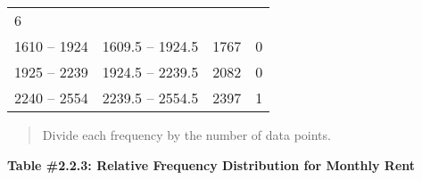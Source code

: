 \documentclass[]{book}
\begin{document}
\begin{longtable}[]{@{}llll@{}}
\begin{minipage}[t]{0.15\columnwidth}
6\strut
\end{minipage}\tabularnewline
\begin{minipage}[t]{0.18\columnwidth}\raggedright
1610 -- 1924\strut
\end{minipage} & \begin{minipage}[t]{0.23\columnwidth}\raggedright
1609.5 -- 1924.5\strut
\end{minipage} & \begin{minipage}[t]{0.14\columnwidth}\raggedright
1767\strut
\end{minipage} & \begin{minipage}[t]{0.15\columnwidth}\raggedright
0\strut
\end{minipage}\tabularnewline
\begin{minipage}[t]{0.18\columnwidth}\raggedright
1925 -- 2239\strut
\end{minipage} & \begin{minipage}[t]{0.23\columnwidth}\raggedright
1924.5 -- 2239.5\strut
\end{minipage} & \begin{minipage}[t]{0.14\columnwidth}\raggedright
2082\strut
\end{minipage} & \begin{minipage}[t]{0.15\columnwidth}\raggedright
0\strut
\end{minipage}\tabularnewline
\begin{minipage}[t]{0.18\columnwidth}\raggedright
2240 -- 2554\strut
\end{minipage} & \begin{minipage}[t]{0.23\columnwidth}\raggedright
2239.5 -- 2554.5\strut
\end{minipage} & \begin{minipage}[t]{0.14\columnwidth}\raggedright
2397\strut
\end{minipage} & \begin{minipage}[t]{0.15\columnwidth}\raggedright
1\strut
\end{minipage}\tabularnewline
\bottomrule
\end{longtable}

\begin{quote}
Divide each frequency by the number of data points.
\end{quote}

\textbf{Table \#2.2.3: Relative Frequency Distribution for Monthly Rent}
\end{document}

